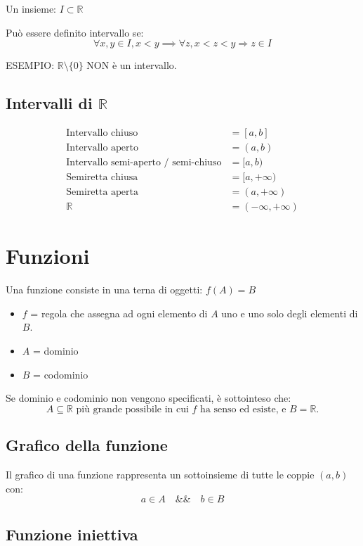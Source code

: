 \documentclass[12pt,a4paper]{article}
\let\oldsection\section
\renewcommand{\section}{\clearpage\oldsection}
\begin{document}
Un insieme: $I \subset \mathbb{R}$  

Può essere definito intervallo se:  
\[
\forall x,y \in I, x<y \implies \forall z, x<z<y \Rightarrow z \in I
\]

ESEMPIO: $\mathbb{R} \setminus \{0\}$ NON è un intervallo.

\subsection{Intervalli di $\mathbb{R}$}

\begin{align*}
\text{Intervallo chiuso} &= [a,b] \\
\text{Intervallo aperto} &= (a,b) \\
\text{Intervallo semi-aperto / semi-chiuso} &= [a,b) \\
\text{Semiretta chiusa} &= [a,+\infty) \\
\text{Semiretta aperta} &= (a,+\infty) \\
\mathbb{R} &= (-\infty,+\infty)
\end{align*}

\section{Funzioni}

Una funzione consiste in una terna di oggetti: $f(A)=B$  

\begin{itemize}
\item $f$ = regola che assegna ad ogni elemento di $A$ uno e uno solo degli elementi di $B$.
\item $A$ = dominio
\item $B$ = codominio
\end{itemize}

Se dominio e codominio non vengono specificati, è sottointeso che:  
\[
A \subseteq \mathbb{R} \text{ più grande possibile in cui } f \text{ ha senso ed esiste, e } B = \mathbb{R}.
\]

\subsection{Grafico della funzione}

Il grafico di una funzione rappresenta un sottoinsieme di tutte le coppie $(a,b)$ con:  
\[
a \in A \quad \&\& \quad b \in B
\]

\subsection{Funzione iniettiva}
\end{document}
